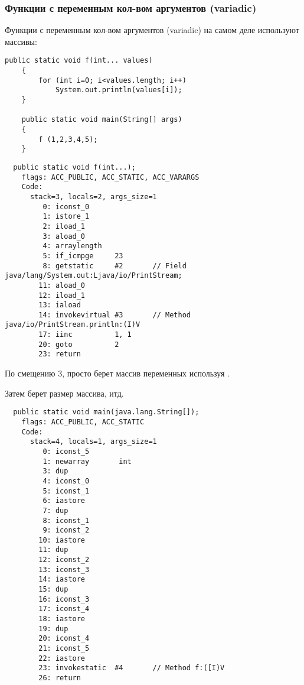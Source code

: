 \subsubsection{Функции с переменным кол-вом аргументов (variadic)}


Функции с переменным кол-вом аргументов (variadic) на самом деле используют массивы:

\begin{lstlisting}[style=customjava]
	public static void f(int... values)
	{
		for (int i=0; i<values.length; i++)
			System.out.println(values[i]);
	}

	public static void main(String[] args) 
	{
		f (1,2,3,4,5);
	}
\end{lstlisting}

\begin{lstlisting}
  public static void f(int...);
    flags: ACC_PUBLIC, ACC_STATIC, ACC_VARARGS
    Code:
      stack=3, locals=2, args_size=1
         0: iconst_0      
         1: istore_1      
         2: iload_1       
         3: aload_0       
         4: arraylength   
         5: if_icmpge     23
         8: getstatic     #2       // Field java/lang/System.out:Ljava/io/PrintStream;
        11: aload_0       
        12: iload_1       
        13: iaload        
        14: invokevirtual #3       // Method java/io/PrintStream.println:(I)V
        17: iinc          1, 1
        20: goto          2
        23: return        
\end{lstlisting}


По смещению 3, \ttf просто берет массив переменных используя .

Затем берет размер массива, итд.

\begin{lstlisting}
  public static void main(java.lang.String[]);
    flags: ACC_PUBLIC, ACC_STATIC
    Code:
      stack=4, locals=1, args_size=1
         0: iconst_5      
         1: newarray       int
         3: dup           
         4: iconst_0      
         5: iconst_1      
         6: iastore       
         7: dup           
         8: iconst_1      
         9: iconst_2      
        10: iastore       
        11: dup           
        12: iconst_2      
        13: iconst_3      
        14: iastore       
        15: dup           
        16: iconst_3      
        17: iconst_4      
        18: iastore       
        19: dup           
        20: iconst_4      
        21: iconst_5      
        22: iastore       
        23: invokestatic  #4       // Method f:([I)V
        26: return        
\end{lstlisting}


